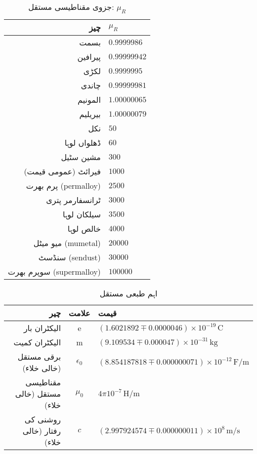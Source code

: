 {\renewcommand{\arraystretch}{1.2}
\begin{table}
\caption*{جزوی مقناطیسی مستقل: $\mu_R$}
\centering
\begin{tabular}{r | l}
\hline
چیز & $\mu_R$ \\
\hline
بسمت & $\num{0.9999986}$\\
پیرافین & $\num{0.99999942}$\\
لکڑی & $\num{0.9999995}$\\
چاندی & $\num{0.99999981}$\\
المونیم & $\num{1.00000065}$\\
بیریلیم & $\num{1.00000079}$\\
نکل & $\num{50}$\\
ڈھلواں لوہا & $\num{60}$\\
مشین سٹیل & $\num{300}$\\
فیرائٹ (عمومی قیمت) & $\num{1000}$\\
پرم بھرت (permalloy) & $\num{2500}$\\
ٹرانسفارمر پتری & $\num{3000}$\\
سیلکان لوہا & $\num{3500}$\\
خالص لوہا & $\num{4000}$\\
میو میٹل (mumetal) & $\num{20000}$\\
سنڈسٹ (sendust) & $\num{30000}$\\
سوپرم بھرت (supermalloy) & $\num{100000}$\\
\end{tabular}
\label{جدول_جدول_جزوی_مقناطیسی_مستقل}
\end{table}
}
{\renewcommand{\arraystretch}{1.2}
\begin{table}
\caption{اہم طبعی مستقل}
\centering
\begin{tabular}{r |c | l}
\hline
چیر & علامت & قیمت\\
\hline
الیکٹران بار & e & $(\num{1.6021892} \mp \num{0.0000046})\times 10^{-19} \, \si{\coulomb}$\\
الیکٹران کمیت & m & $(\num{9.109534} \mp  \num{0.000047}) \times 10^{-31} \, \si{\kilogram}$\\
برقی مستقل (خالی خلاء) & $\epsilon_0$ & $(\num{8.854187818} \mp \num{0.000000071} ) \times 10^{-12} \, \si{\farad \per \meter}$\\
مقناطیسی مستقل (خالی خلاء) & $\mu_0$  &   $4 \pi 10^{-7} \, \si{\henry \per \meter}$\\
روشنی کی رفتار (خالی خلاء) & $c$ & $(\num{2.997924574} \mp \num{0.000000011}) \times 10^{8} \, \si{\meter \per \second}$\\
\end{tabular}
\label{جدول-جدول_اہم_مستقل}
\end{table}
}
